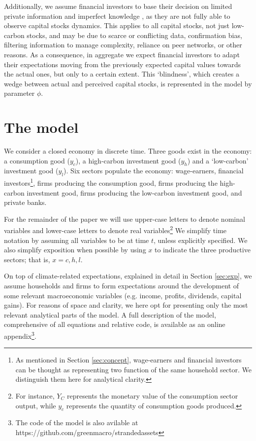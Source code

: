 \documentclass[authoryear]{article}
\begin{document}
Additionally, we assume financial investors to base their decision on limited private information and imperfect knowledge \citep{Daniel1998}, as they are not fully able to observe capital stocks dynamics. This applies to all capital stocks, not just low-carbon stocks, and may be due to scarce or conflicting data, confirmation bias, filtering information to manage complexity, reliance on peer networks, or other reasons. As a consequence, in aggregate we expect financial investors to adapt their expectations moving from the previously expected capital values towards the actual ones, but only to a certain extent. This `blindness', which creates a wedge between actual and perceived capital stocks, is represented in the model by parameter $\phi$.


\section{The model}
\label{sec:model}

We consider a closed economy in discrete time. Three goods exist in the economy: a consumption good ($y_c$), a high-carbon investment good ($y_h$) and a `low-carbon' investment good ($y_l$). Six sectors populate the economy: wage-earners, financial investors\footnote{As mentioned in Section \ref{sec:concept}, wage-earners and financial investors can be thought as representing two function of the same household sector. We distinguish them here for analytical clarity.}, firms producing the consumption good, firms producing the high-carbon investment good, firms producing the low-carbon investment good, and private banks. 

For the remainder of the paper we will use upper-case letters to denote nominal variables and lower-case letters to denote real variables\footnote{For instance, $Y_C$ represents the monetary value of the consumption sector output, while $y_c$ represents the quantity of consumption goods produced.} We simplify time notation by assuming all variables to be at time $t$, unless explicitly specified. We also simplify exposition when possible by using $x$ to indicate the three productive sectors; that is, $x=c,h,l$.

On top of climate-related expectations, explained in detail in Section \ref{sec:exp}, we assume households and firms to form expectations around the development of some relevant macroeconomic variables (e.g. income, profits, dividends, capital gains). For reasons of space and clarity, we here opt for presenting only the most relevant analytical parts of the model. A full description of the model, comprehensive of all equations and relative code, is available as an online appendix\footnote{The code of the model is also avilable at https://github.com/greenmacro/strandedassets}.
\end{document}
